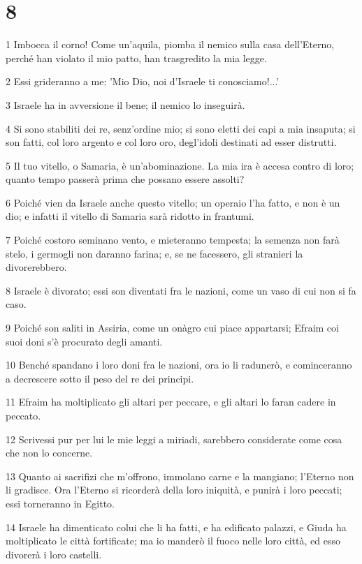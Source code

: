 \chapter{8}

\par 1 Imbocca il corno! Come un'aquila, piomba il nemico sulla casa dell'Eterno, perché han violato il mio patto, han trasgredito la mia legge.
\par 2 Essi grideranno a me: 'Mio Dio, noi d'Israele ti conosciamo!...'
\par 3 Israele ha in avversione il bene; il nemico lo inseguirà.
\par 4 Si sono stabiliti dei re, senz'ordine mio; si sono eletti dei capi a mia insaputa; si son fatti, col loro argento e col loro oro, degl'idoli destinati ad esser distrutti.
\par 5 Il tuo vitello, o Samaria, è un'abominazione. La mia ira è accesa contro di loro; quanto tempo passerà prima che possano essere assolti?
\par 6 Poiché vien da Israele anche questo vitello; un operaio l'ha fatto, e non è un dio; e infatti il vitello di Samaria sarà ridotto in frantumi.
\par 7 Poiché costoro seminano vento, e mieteranno tempesta; la semenza non farà stelo, i germogli non daranno farina; e, se ne facessero, gli stranieri la divorerebbero.
\par 8 Israele è divorato; essi son diventati fra le nazioni, come un vaso di cui non si fa caso.
\par 9 Poiché son saliti in Assiria, come un onàgro cui piace appartarsi; Efraim coi suoi doni s'è procurato degli amanti.
\par 10 Benché spandano i loro doni fra le nazioni, ora io li radunerò, e cominceranno a decrescere sotto il peso del re dei principi.
\par 11 Efraim ha moltiplicato gli altari per peccare, e gli altari lo faran cadere in peccato.
\par 12 Scrivessi pur per lui le mie leggi a miriadi, sarebbero considerate come cosa che non lo concerne.
\par 13 Quanto ai sacrifizi che m'offrono, immolano carne e la mangiano; l'Eterno non li gradisce. Ora l'Eterno si ricorderà della loro iniquità, e punirà i loro peccati; essi torneranno in Egitto.
\par 14 Israele ha dimenticato colui che li ha fatti, e ha edificato palazzi, e Giuda ha moltiplicato le città fortificate; ma io manderò il fuoco nelle loro città, ed esso divorerà i loro castelli.

